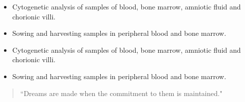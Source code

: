 \documentclass[10pt,a4paper,ragged2e,]{altacv}
\begin{document}
\divider

\begin{itemize}
\item Cytogenetic analysis of samples of blood, bone marrow, amniotic fluid and chorionic villi.
\item Sowing and harvesting samples in peripheral blood and bone marrow.
\end{itemize}

\divider


\begin{itemize}
\item Cytogenetic analysis of samples of blood, bone marrow, amniotic fluid and chorionic villi.
\item Sowing and harvesting samples in peripheral blood and bone marrow.
\end{itemize}





\begin{quote}
``Dreams are made when the commitment to them is maintained."
\end{quote}



\divider

\end{document}
